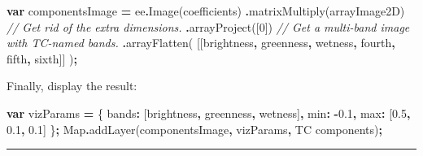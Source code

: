\documentclass[
]{article}
\newenvironment{Shaded}{\begin{snugshade}}{\end{snugshade}}
\newcommand{\BuiltInTok}[1]{#1}
\newcommand{\CommentTok}[1]{\textcolor[rgb]{0.56,0.35,0.01}{\textit{#1}}}
\newcommand{\DataTypeTok}[1]{\textcolor[rgb]{0.13,0.29,0.53}{#1}}
\newcommand{\DecValTok}[1]{\textcolor[rgb]{0.00,0.00,0.81}{#1}}
\newcommand{\FloatTok}[1]{\textcolor[rgb]{0.00,0.00,0.81}{#1}}
\newcommand{\FunctionTok}[1]{\textcolor[rgb]{0.00,0.00,0.00}{#1}}
\newcommand{\KeywordTok}[1]{\textcolor[rgb]{0.13,0.29,0.53}{\textbf{#1}}}
\newcommand{\NormalTok}[1]{#1}
\newcommand{\OperatorTok}[1]{\textcolor[rgb]{0.81,0.36,0.00}{\textbf{#1}}}
\newcommand{\StringTok}[1]{\textcolor[rgb]{0.31,0.60,0.02}{#1}}
\begin{document}
\begin{Shaded}
\begin{Highlighting}[]
\KeywordTok{var}\NormalTok{ componentsImage }\OperatorTok{=}\NormalTok{ ee}\OperatorTok{.}\FunctionTok{Image}\NormalTok{(coefficients)}
                \OperatorTok{.}\FunctionTok{matrixMultiply}\NormalTok{(arrayImage2D)}
\CommentTok{// Get rid of the extra  dimensions.}
                \OperatorTok{.}\FunctionTok{arrayProject}\NormalTok{([}\DecValTok{0}\NormalTok{])  }
\CommentTok{// Get a multi{-}band image  with TC{-}named bands.  }
                \OperatorTok{.}\FunctionTok{arrayFlatten}\NormalTok{(}
\NormalTok{          [[}\StringTok{\textquotesingle{}brightness\textquotesingle{}}\OperatorTok{,} \StringTok{\textquotesingle{}greenness\textquotesingle{}}\OperatorTok{,} \StringTok{\textquotesingle{}wetness\textquotesingle{}}\OperatorTok{,} \StringTok{\textquotesingle{}fourth\textquotesingle{}}\OperatorTok{,} \StringTok{\textquotesingle{}fifth\textquotesingle{}}\OperatorTok{,} \StringTok{\textquotesingle{}sixth\textquotesingle{}}\NormalTok{]]}
\NormalTok{        )}\OperatorTok{;}  
\end{Highlighting}
\end{Shaded}

Finally, display the result:

\begin{Shaded}
\begin{Highlighting}[]
\KeywordTok{var}\NormalTok{ vizParams }\OperatorTok{=}\NormalTok{ \{}
  \DataTypeTok{bands}\OperatorTok{:}\NormalTok{ [}\StringTok{\textquotesingle{}brightness\textquotesingle{}}\OperatorTok{,} \StringTok{\textquotesingle{}greenness\textquotesingle{}}\OperatorTok{,} \StringTok{\textquotesingle{}wetness\textquotesingle{}}\NormalTok{]}\OperatorTok{,}
  \DataTypeTok{min}\OperatorTok{:} \OperatorTok{{-}}\FloatTok{0.1}\OperatorTok{,} \DataTypeTok{max}\OperatorTok{:}\NormalTok{ [}\FloatTok{0.5}\OperatorTok{,}  \FloatTok{0.1}\OperatorTok{,} \FloatTok{0.1}\NormalTok{]}
\NormalTok{\}}\OperatorTok{;}
\BuiltInTok{Map}\OperatorTok{.}\FunctionTok{addLayer}\NormalTok{(componentsImage}\OperatorTok{,}\NormalTok{ vizParams}\OperatorTok{,} \StringTok{\textquotesingle{}TC components\textquotesingle{}}\NormalTok{)}\OperatorTok{;}  
\end{Highlighting}
\end{Shaded}

\begin{center}\rule{0.5\linewidth}{0.5pt}\end{center}
\end{document}
